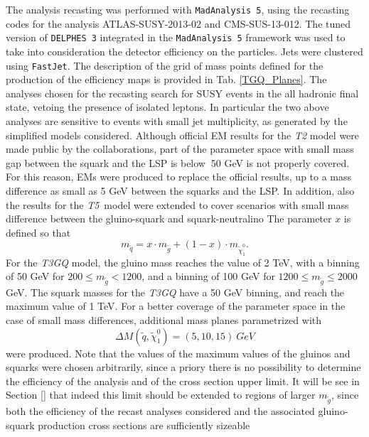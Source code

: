 \documentclass[preprint,number,sort&compress,twocolumn,3p]{elsstyarticle}
\newcommand{\MGLU}{$ m _{ \tilde g } $\xspace}
\newcommand{\Tfive}{ \textit{T5}}
\begin{document}
%
The analysis recasting was performed with \texttt{MadAnalysis 5}, using the recasting codes for the analysis ATLAS-SUSY-2013-02\cite{ATLAS-SUSY-2013-02MA5,ATLAS-SUSY-2013-02VALIDATION} and CMS-SUS-13-012\cite{CMS-SUS-13-012MA5,CMS-SUS-13-012VALIDATION}. The tuned version of \texttt{DELPHES 3} integrated in the \texttt{MadAnalysis 5} framework was used to take into consideration the detector efficiency on the particles. Jets were clustered using \texttt{FastJet}\cite{Cacciari:2011ma}.
%
The description of the grid of mass points defined for the production of the efficiency maps is provided in Tab. \ref{TGQ_Planes}. The analyses chosen for the recasting search for SUSY events in the all hadronic final state, vetoing the presence of isolated leptons. In particular the two above analyses are sensitive to events with small jet multiplicity, as generated by the simplified models considered. Although official EM results for the \textit{T2} model were made public by the collaborations, part of the parameter space with small mass gap between the squark and the LSP is below $~$50 GeV is not properly covered. For this reason, EMs were produced to replace the official results, up to a mass difference as small as 5 GeV between the squarks and the LSP. In addition, also the results for the \Tfive~model were extended to cover scenarios with small mass difference between the gluino-squark and squark-neutralino The parameter $x$ is defined so that
\begin{equation}
m_{\tilde q}= x\cdot m_{\tilde g} + (1-x)\cdot m_{\tilde \chi_1 ^0}.
\end{equation}
%
For the \textit{T3GQ} model, the gluino mass reaches the value of 2 TeV, with a binning of 50 GeV for $200 \leq m_{\tilde g} < 1200$, and a binning of 100 GeV for $1200 \leq m_{\tilde g}  \leq 2000$ GeV. The squark masses for the \textit{T3GQ} have a 50 GeV binning, and reach the maximum value of 1 TeV. For a better coverage of the parameter space in the case of small mass differences, additional mass planes parametrized with 
\begin{equation}
\Delta M ( \tilde q, \tilde \chi _1 ^0)=(5,10,15) \ GeV
\end{equation}
were produced. Note that the values of the maximum values of the gluinos and squarks were chosen arbitrarily, since a priory there is no possibility to determine the efficiency of the analysis and of the cross section upper limit. It will be see in Section \ref{} that indeed this limit should be extended to regions of larger \MGLU, since both the efficiency of the recast analyses considered and the associated gluino-squark production cross sections are sufficiently sizeable 
\end{document}
